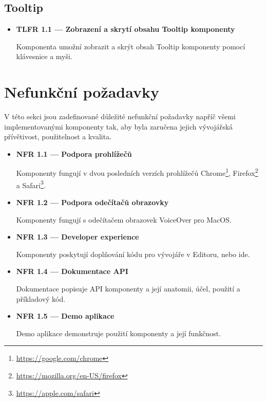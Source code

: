 \subsection{Tooltip}

\begin{itemize}
      \item \textbf{TLFR 1.1 --- Zobrazení a skrytí obsahu Tooltip komponenty}\label{tlfr11}

            Komponenta umožní zobrazit a skrýt obsah Tooltip komponenty pomocí klávesnice a myši.
\end{itemize}

\section{Nefunkční požadavky}

V této sekci jsou zadefinované důležité nefunkční požadavky napříč všemi implementovanými komponenty tak, aby byla zaručena jejich vývojářská přívětivost, použitelnost a kvalita.

\begin{itemize}
      \item \textbf{NFR 1.1 --- Podpora prohlížečů}\label{nfr11}

            Komponenty fungují v dvou posledních verzích prohlížečů Chrome\footnote{\url{https://google.com/chrome}}, Firefox\footnote{\url{https://mozilla.org/en-US/firefox}} a Safari\footnote{\url{https://apple.com/safari}}.

      \item \textbf{NFR 1.2 --- Podpora odečítačů obrazovky}\label{nfr12}

            Komponenty fungují s odečítačem obrazovek VoiceOver pro MacOS.

      \item \textbf{NFR 1.3 --- Developer experience}\label{nfr13}

            Komponenty poskytují doplňování kódu pro vývojáře v Editoru, nebo \gls{ide}.

      \item \textbf{NFR 1.4 --- Dokumentace API}\label{nfr14}

            Dokumentace popisuje API komponenty a její anatomii, účel, použití a příkladový kód.

      \item \textbf{NFR 1.5 --- Demo aplikace}\label{nfr15}

            Demo aplikace demonstruje použití komponenty a její funkčnost.
\end{itemize}


